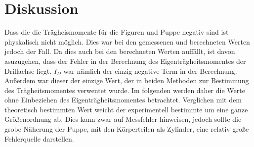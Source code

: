 \section{Diskussion}
\label{sec:Diskussion}
Dass die die Trägheismomente für die Figuren und Puppe negativ sind ist physkalisch nicht möglich.
Dies war bei den gemessenen und berechneten Werten jedoch der Fall.
Da dies auch bei den berechneten Werten auffällt, ist davon asuzugehen, dass der Fehler in der Berechnung des Eigenträgheitsmomentes der Drillachse liegt.
$I_D$ war nämlich der einzig negative Term in der Berechnung.
Außerdem war dieser der einzige Wert, der in beiden Methoden zur Bestimmung des Trägheitsmomentes verwentet wurde.
Im folgenden werden daher die Werte ohne Einbeziehen des Eigenträgheitsmomentes betrachtet.
Verglichen mit dem theoretisch bestimmten Wert weicht der experimentell bestimmte um eine ganze Größenordnung ab.
Dies kann zwar auf Messfehler hinweisen, jedoch sollte die grobe Näherung der Puppe, mit den Körperteilen als Zylinder, eine relativ große Fehlerquelle darstellen.

